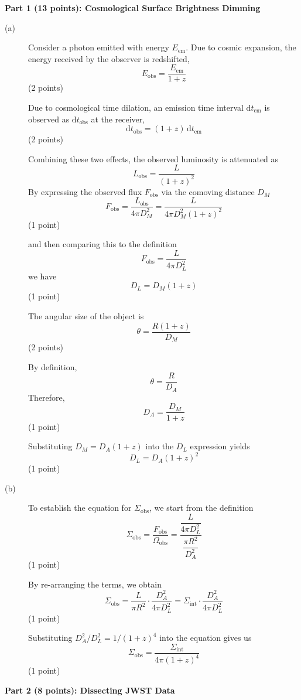 \noindent\textbf{Part 1 (13 points): Cosmological Surface Brightness Dimming}
\begin{description}
\item[(a)] Consider a photon emitted with energy $E_{\mathrm{em}}$. Due to
  cosmic expansion, the energy received by the observer is redshifted,
  \[ E_{\mathrm{obs}} = \frac{E_{\mathrm{em}}}{1+z} \]
  \hfill(2 points)

  Due to cosmological time dilation, an emission time interval
  $\mathrm{d}t_{\mathrm{em}}$ is observed as $\mathrm{d}t_{\mathrm{obs}}$ at
  the receiver,
  \[ \mathrm{d}t_{\mathrm{obs}} = (1+z)\,\mathrm{d}t_{\mathrm{em}} \]
  \hfill(2 points)

  Combining these two effects, the observed luminosity is attenuated as
  \[ L_{\mathrm{obs}} = \frac{L}{(1+z)^2} \]
  By expressing the observed flux $F_{\mathrm{obs}}$ via the comoving distance
  $D_M$
  \[ F_{\mathrm{obs}} = \frac{L_{\mathrm{obs}}}{4\pi D_M^2}
     = \frac{L}{4\pi D_M^2 (1+z)^2} \]
  \hfill(1 point)

  and then comparing this to the definition
  \[ F_{\mathrm{obs}} = \frac{L}{4\pi D_L^2} \]
  we have
  \[ D_L = D_M (1+z) \]
  \hfill(1 point)

  The angular size of the object is
  \[ \theta = \frac{R(1+z)}{D_M} \]
  \hfill(2 points)

  By definition,
  \[ \theta = \frac{R}{D_A} \]
  Therefore,
  \[ D_A = \frac{D_M}{1+z} \]
  \hfill(1 point)

  Substituting $D_M = D_A(1+z)$ into the $D_L$ expression yields
  \[ D_L = D_A (1+z)^2 \]
  \hfill(1 point)

\item[(b)] To establish the equation for $\Sigma_{\mathrm{obs}}$, we start
  from the definition
  \[ \Sigma_{\mathrm{obs}} = \frac{F_{\mathrm{obs}}}{\Omega_{\mathrm{obs}}}
     = \frac{\dfrac{L}{4\pi D_L^2}}{\dfrac{\pi R^2}{D_A^2}} \]
  \hfill(1 point)

  By re-arranging the terms, we obtain
  \[ \Sigma_{\mathrm{obs}} = \frac{L}{\pi R^2} \cdot \frac{D_A^2}{4\pi D_L^2}
     = \Sigma_{\mathrm{int}} \cdot \frac{D_A^2}{4\pi D_L^2} \]
  \hfill(1 point)

  Substituting $D_A^2/D_L^2 = 1/(1+z)^4$ into the equation gives us
  \[ \Sigma_{\mathrm{obs}} = \frac{\Sigma_{\mathrm{int}}}{4\pi(1+z)^4} \]
  \hfill(1 point)
\end{description}

\medskip\noindent\textbf{Part 2 (8 points): Dissecting JWST Data}

